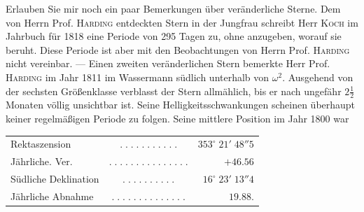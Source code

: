 \par\indent Erlauben Sie mir noch ein paar Bemerkungen über veränderliche Sterne. Dem von Herrn Prof. \textsc{Harding} entdeckten Stern in der Jungfrau schreibt Herr \textsc{Koch} im Jahrbuch für 1818 eine Periode von 295 Tagen zu, ohne anzugeben, worauf sie beruht. Diese Periode ist aber mit den Beobachtungen von Herrn Prof. \textsc{Harding} nicht vereinbar. — Einen zweiten veränderlichen Stern bemerkte Herr Prof. \textsc{Harding} im Jahr 1811 im Wassermann südlich unterhalb von $\omega^2$. Ausgehend von der sechsten Größenklasse verblasst der Stern allmählich, bis er nach ungefähr $2\frac12$ Monaten völlig unsichtbar ist. Seine Helligkeitsschwankungen scheinen überhaupt keiner regelmäßigen Periode zu folgen. Seine mittlere Position im Jahr 1800 war
\begin{center}\fontsize{10}{12}\selectfont\setlength{\tabcolsep}{3pt}\begin{tabular}{lcr}
Rektaszension & $.\;.\;.\;.\;.\;.\;.\;.\;.\;.\;.$ & $353^\circ\;21'\;48''5$\\
Jährliche. Ver. & $.\;.\;.\;.\;.\;.\;.\;.\;.\;.\;.\;.\;.\;.\;.$ & $+46.56$\\
Südliche Deklination & $.\;.\;.\;.\;.\;.\;.\;.\;.\;.$ & $16^\circ\;23'\;13''4$\\
Jährliche Abnahme & $.\;.\;.\;.\;.\;.\;.\;.\;.\;.\;.\;.\;.\;.$ & $19.88$.\\
\end{tabular}\end{center}
